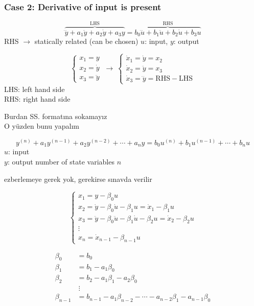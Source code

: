\documentclass[11pt,a4paper]{article}
\begin{document}
\subsubsection{Case 2: Derivative of input is present}

\[
\overbrace{\dddot{y}+a_1\ddot{y}+a_2\dot{y}+a_3y}^{\text{LHS}}=\overbrace{b_0\dddot{u}+b_1\ddot{u}+b_2\dot{u}+b_3u}^{\text{RHS}}
\]
RHS $\to$ statically related \qquad (can be chosen) $u$: input, $y$: output

\[
\left\{\begin{array}{l}x_1=y\\x_2=\dot{y}\\x_3=\ddot{y}\end{array}\right.
\ \to\
\left\{\begin{array}{l}\dot{x}_1=\dot{y}=x_2\\ \dot{x}_2=\ddot{y}=x_3\\ \dot{x}_3=\dddot{y}=\mathrm{RHS}-\mathrm{LHS}\end{array}\right.
\]
LHS: left hand side\\
RHS: right hand side

Burdan SS. formatına sokamayız\\
O yüzden bunu yapalım

\[
y^{(n)}+a_1y^{(n-1)}+a_2y^{(n-2)}+\cdots+a_ny=b_0u^{(n)}+b_1u^{(n-1)}+\cdots+b_nu
\]
$u$: input\\
$y$: output \qquad\qquad number of state variables $n$

ezberlemeye gerek yok, gerekirse sınavda verilir

\[
\left\{\begin{array}{l}
x_1=y-\beta_0u\\
x_2=\dot{y}-\beta_0\dot{u}-\beta_1u=\dot{x}_1-\beta_1u\\
x_3=\ddot{y}-\beta_0\ddot{u}-\beta_1\dot{u}-\beta_2u=\dot{x}_2-\beta_2u\\
\vdots\\
x_n=\dot{x}_{n-1}-\beta_{n-1}u
\end{array}\right.
\]

\begin{align*}
\beta_0&=b_0\\
\beta_1&=b_1-a_1\beta_0\\
\beta_2&=b_2-a_1\beta_1-a_2\beta_0\\
&\ \vdots\\
\beta_{n-1}&=b_{n-1}-a_1\beta_{n-2}-\cdots-a_{n-2}\beta_1-a_{n-1}\beta_0
\end{align*}
\end{document}
